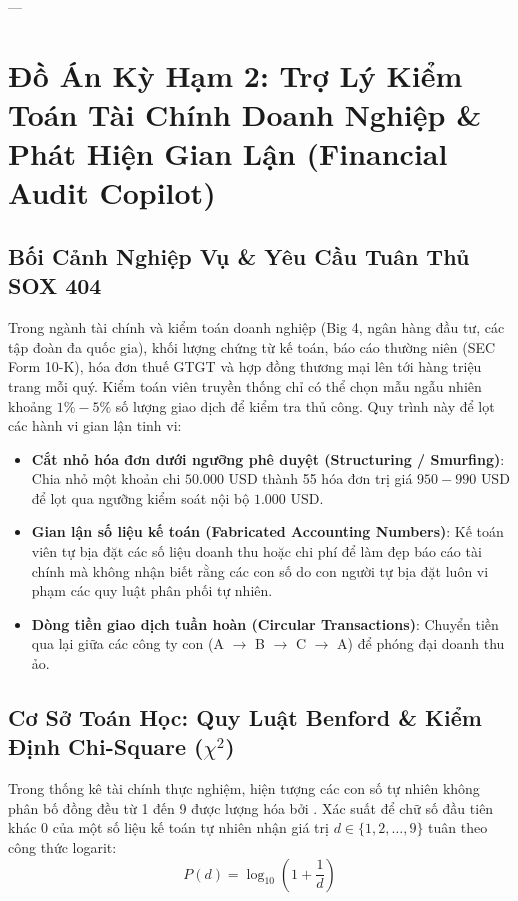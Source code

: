 ---

\section{Đồ Án Kỳ Hạm 2: Trợ Lý Kiểm Toán Tài Chính Doanh Nghiệp \& Phát Hiện Gian Lận (Financial Audit Copilot)}
\label{sec:ch14-financial-copilot}

\subsection{Bối Cảnh Nghiệp Vụ \& Yêu Cầu Tuân Thủ SOX 404}
Trong ngành tài chính và kiểm toán doanh nghiệp (Big 4, ngân hàng đầu tư, các tập đoàn đa quốc gia), khối lượng chứng từ kế toán, báo cáo thường niên (SEC Form 10-K), hóa đơn thuế GTGT và hợp đồng thương mại lên tới hàng triệu trang mỗi quý.
Kiểm toán viên truyền thống chỉ có thể chọn mẫu ngẫu nhiên khoảng $1\% - 5\%$ số lượng giao dịch để kiểm tra thủ công. Quy trình này để lọt các hành vi gian lận tinh vi:
\begin{itemize}
  \item \textbf{Cắt nhỏ hóa đơn dưới ngưỡng phê duyệt (Structuring / Smurfing)}: Chia nhỏ một khoản chi $50.000\text{ USD}$ thành 55 hóa đơn trị giá $950 - 990\text{ USD}$ để lọt qua ngưỡng kiểm soát nội bộ $1.000\text{ USD}$.
  \item \textbf{Gian lận số liệu kế toán (Fabricated Accounting Numbers)}: Kế toán viên tự bịa đặt các số liệu doanh thu hoặc chi phí để làm đẹp báo cáo tài chính mà không nhận biết rằng các con số do con người tự bịa đặt luôn vi phạm các quy luật phân phối tự nhiên.
  \item \textbf{Dòng tiền giao dịch tuần hoàn (Circular Transactions)}: Chuyển tiền qua lại giữa các công ty con (A $\to$ B $\to$ C $\to$ A) để phóng đại doanh thu ảo.
\end{itemize}

\subsection{Cơ Sở Toán Học: Quy Luật Benford \& Kiểm Định Chi-Square (\texorpdfstring{$\chi^2$}{Chi-Square})}
Trong thống kê tài chính thực nghiệm, hiện tượng các con số tự nhiên không phân bố đồng đều từ 1 đến 9 được lượng hóa bởi .
Xác suất để chữ số đầu tiên khác 0 của một số liệu kế toán tự nhiên nhận giá trị $d \in \{1, 2, \dots, 9\}$ tuân theo công thức logarit:
\begin{equation}
P(d) = \log_{10} \left( 1 + \frac{1}{d} \right)
\label{eq:benford-law}
\end{equation}

